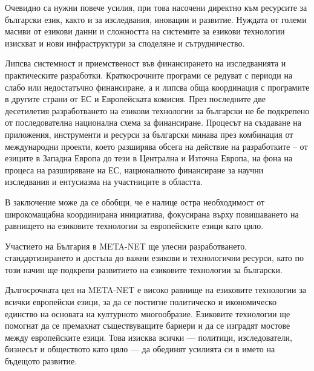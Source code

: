\documentclass[]{../../metanetpaper}
\begin{document}
\begin{multicols}{2}
Очевидно са нужни повече усилия, при това насочени директно към
ресурсите за български език, както и за изследвания, иновации и
развитие.  Нуждата от големи масиви от езикови данни и сложността на
системите за езикови технологии изискват и нови инфраструктури за
споделяне и сътрудничество.

Липсва системност и приемственост във финансирането на изследванията и
практическите разработки. Краткосрочните програми се редуват с периоди
на слабо или недостатъчно финансиране, а и липсва обща координация с
програмите в другите страни от ЕС и Европейската комисия.  През
последните две десетилетия разработването на езикови технологии за
български не бе подкрепено от последователна национална схема за
финансиране. Процесът на създаване на приложения, инструменти и
ресурси за български минава през комбинация от международни проекти,
което разширява обсега на действие на разработките – от езиците в
Западна Европа до тези в Централна и Източна Европа, на фона на
процеса на разширяване на ЕС, националното финансиране за научни
изследвания и ентусиазма на участниците в областта.

В заключение може да се обобщи, че е налице остра необходимост от
широкомащабна координирана инициатива, фокусирана върху повишаването
на равнището на езиковите технологии за европейските езици като цяло.

Участието на България в META-NET ще улесни разработването,
стандартизирането и достъпа до важни езикови и технологични ресурси,
като по този начин ще подкрепи развитието на езиковите технологии за
български.

Дългосрочната цел на META-NET е високо равнище на езиковите технологии
за всички европейски езици, за да се постигне политическо и
икономическо единство на основата на културното
многообразие. Езиковите технологии ще помогнат да се премахнат
съществуващите бариери и да се изградят мостове между европейските
езици. Това изисква всички — политици, изследователи, бизнесът и
обществото като цяло — да обединят усилията си в името на бъдещото
развитие.
\end{multicols}

\clearpage
\end{document}
